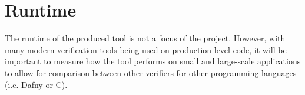 \section{Runtime}
The runtime of the produced tool is not a focus of the project. However, with many modern verification tools being used on production-level code, it will be important to measure how the tool performs on small and large-scale applications to allow for comparison between other verifiers for other programming languages (i.e. Dafny or C).
